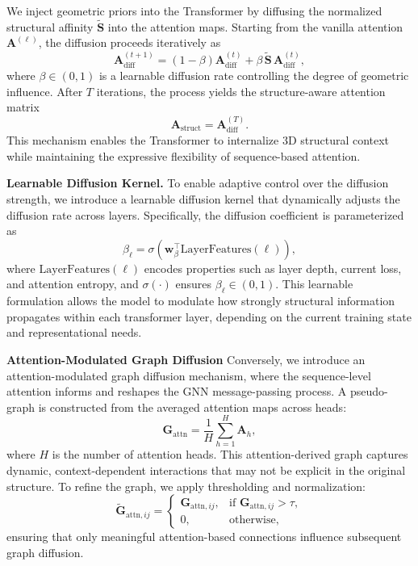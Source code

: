 \documentclass[11pt]{article}
\begin{document}
We inject geometric priors into the Transformer by diffusing the normalized structural affinity $\mathbf{\tilde{S}}$ into the attention maps. Starting from the vanilla attention $\mathbf{A}^{(\ell)}$, the diffusion proceeds iteratively as
\begin{equation}
    \mathbf{A}_{\text{diff}}^{(t+1)} = (1-\beta)\mathbf{A}_{\text{diff}}^{(t)}
    + \beta\,\mathbf{\tilde{S}}\,\mathbf{A}_{\text{diff}}^{(t)},
    \label{eq:attn_diffusion}
\end{equation}
where $\beta \in (0,1)$ is a learnable diffusion rate controlling the degree of geometric influence. After $T$ iterations, the process yields the structure-aware attention matrix
\begin{equation}
    \mathbf{A}_{\text{struct}} = \mathbf{A}_{\text{diff}}^{(T)}.
\end{equation}
This mechanism enables the Transformer to internalize 3D structural context while maintaining the expressive flexibility of sequence-based attention.




\textbf{Learnable Diffusion Kernel.}
To enable adaptive control over the diffusion strength, we introduce a learnable diffusion kernel that dynamically adjusts the diffusion rate across layers. Specifically, the diffusion coefficient is parameterized as
\begin{equation}
    \beta_{\ell} = \sigma(\mathbf{w}_\beta^\top \text{LayerFeatures}(\ell)),
\end{equation}
where $\text{LayerFeatures}(\ell)$ encodes properties such as layer depth, current loss, and attention entropy, and $\sigma(\cdot)$ ensures $\beta_\ell \in (0,1)$.
This learnable formulation allows the model to modulate how strongly structural information propagates within each transformer layer, depending on the current training state and representational needs.


\textbf{
Attention-Modulated Graph Diffusion
}
Conversely, we introduce an attention-modulated graph diffusion mechanism, where the sequence-level attention informs and reshapes the GNN message-passing process.
A pseudo-graph is constructed from the averaged attention maps across heads:
\begin{equation}
    \mathbf{G}_{\text{attn}} = \frac{1}{H} \sum_{h=1}^H \mathbf{A}_h,
\end{equation}
where $H$ is the number of attention heads.
This attention-derived graph captures dynamic, context-dependent interactions that may not be explicit in the original structure.
To refine the graph, we apply thresholding and normalization:
\begin{equation}
    \mathbf{\tilde{G}}_{\text{attn}, ij} =
    \begin{cases}
        \mathbf{G}_{\text{attn}, ij}, & \text{if } \mathbf{G}_{\text{attn}, ij} > \tau, \\
        0, & \text{otherwise},
    \end{cases}
\end{equation}
ensuring that only meaningful attention-based connections influence subsequent graph diffusion.
\end{document}
